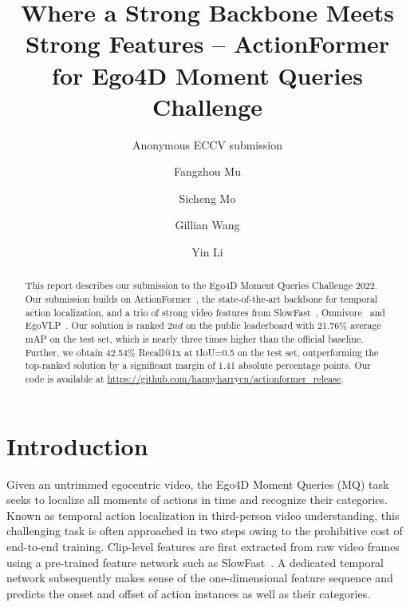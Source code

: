\documentclass[runningheads]{llncs}
\begin{document}
\pagestyle{headings}
\mainmatter
\def\ECCVSubNumber{100}  

\title{Where a Strong Backbone Meets Strong Features -- ActionFormer for Ego4D Moment Queries Challenge} 

\authorrunning{ECCV-22 submission ID \ECCVSubNumber} 
\author{Anonymous ECCV submission}
\institute{Paper ID \ECCVSubNumber}




\author{Fangzhou Mu \and
Sicheng Mo \and
Gillian Wang \and
Yin Li}

\maketitle

\begin{abstract}
This report describes our submission to the Ego4D Moment Queries Challenge 2022. Our submission builds on ActionFormer~\cite{zhang2022actionformer}, the state-of-the-art backbone for temporal action localization, and a trio of strong video features from SlowFast~\cite{Feichtenhofer_2019_ICCV}, Omnivore~\cite{girdhar2022omnivore} and EgoVLP~\cite{kevin2022egovlp}. Our solution is ranked 2$nd$ on the public leaderboard with 21.76\% average mAP on the test set, which is nearly three times higher than the official baseline. Further, we obtain 42.54\% Recall@1x at tIoU=0.5 on the test set, outperforming the top-ranked solution by a significant margin of 1.41 absolute percentage points. Our code is available at \url{ https://github.com/happyharrycn/actionformer\_release}.

\end{abstract}


\section{Introduction}

Given an untrimmed egocentric video, the Ego4D Moment Queries (MQ) task seeks to localize all moments of actions in time and recognize their categories. Known as temporal action localization in third-person video understanding, this challenging task is often approached in two steps owing to the prohibitive cost of end-to-end training. Clip-level features are first extracted from raw video frames using a pre-trained feature network such as SlowFast~\cite{Feichtenhofer_2019_ICCV}. A dedicated temporal network subsequently makes sense of the one-dimensional feature sequence and predicts the onset and offset of action instances as well as their categories.
\end{document}
